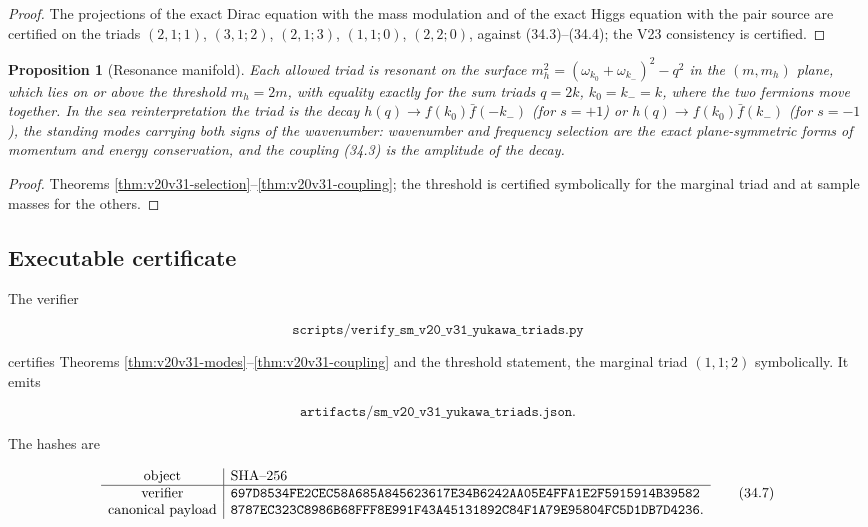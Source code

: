 \documentclass[11pt]{article}
\newtheorem{proposition}[theorem]{Proposition}
\theoremstyle{remark}
\begin{document}
\begin{proof}
The projections of the exact Dirac equation with the mass
modulation and of the exact Higgs equation with the pair source are
certified on the triads \((2,1;1)\), \((3,1;2)\), \((2,1;3)\),
\((1,1;0)\), \((2,2;0)\), against (34.3)--(34.4); the V23
consistency is certified.
\end{proof}

\begin{proposition}[Resonance manifold]
\label{prop:v20v31-manifold}
Each allowed triad is resonant on the surface
\(m_h^2=(\omega_{k_0}+\omega_{k_-})^2-q^2\) in the \((m,m_h)\) plane, which
lies on or above the threshold \(m_h=2m\), with equality exactly for
the sum triads \(q=2k\), \(k_0=k_-=k\), where the two fermions move
together.  In the sea
reinterpretation the triad is the decay \(h(q)\to f(k_0)\bar f(-k_-)\)
(for \(s=+1\)) or \(h(q)\to f(k_0)\bar f(k_-)\) (for \(s=-1\)), the
standing modes carrying both signs of the wavenumber: wavenumber and
frequency selection are the exact plane-symmetric forms of momentum
and energy conservation, and the coupling (34.3) is the amplitude
of the decay.
\end{proposition}

\begin{proof}
Theorems \ref{thm:v20v31-selection}--\ref{thm:v20v31-coupling}; the
threshold is certified symbolically for the marginal triad and at
sample masses for the others.
\end{proof}

\subsection{Executable certificate}

The verifier

\[
 \texttt{scripts/verify\_sm\_v20\_v31\_yukawa\_triads.py}             \tag{34.5}
\]

certifies Theorems \ref{thm:v20v31-modes}--\ref{thm:v20v31-coupling}
and the threshold statement, the marginal triad \((1,1;2)\)
symbolically.  It emits

\[
 \texttt{artifacts/sm\_v20\_v31\_yukawa\_triads.json}.                \tag{34.6}
\]

The hashes are

\[
\begin{array}{c|l}
\hbox{object}&\hbox{SHA--256}\\ \hline
\hbox{verifier}&
\texttt{697D8534FE2CEC58A685A845623617E34B6242AA05E4FFA1E2F5915914B39582}\\
\hbox{canonical payload}&
\texttt{8787EC323C8986B68FFF8E991F43A45131892C84F1A79E95804FC5D1DB7D4236}.
\end{array}                                                     \tag{34.7}
\]
\end{document}
